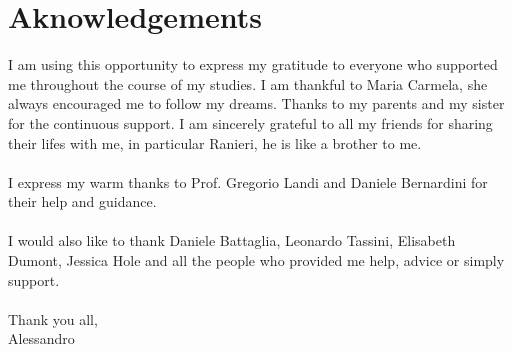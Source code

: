 \cleardoublepage


%

\begingroup

	\let\clearpage\relax
	\let\cleardoublepage\relax
	\let\cleardoublepage\relax
	
\chapter*{Aknowledgements}
I am using this opportunity to express my gratitude to everyone who supported me throughout the course of my studies. I am thankful to Maria Carmela, she always encouraged me to follow my dreams. Thanks to my parents and my sister for the continuous support. I am sincerely grateful to all my friends for sharing their lifes with me, in particular Ranieri, he is like a brother to me.\\\\
I express my warm thanks to Prof. Gregorio Landi and Daniele Bernardini for their help and guidance. \\\\
I would also like to thank Daniele Battaglia, Leonardo Tassini, Elisabeth Dumont, Jessica Hole and all the people who provided me help, advice or simply support.\\\\
Thank you all,\\
Alessandro

		

\endgroup